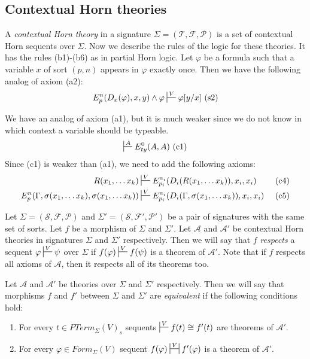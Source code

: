 \documentclass{amsart}
\theoremstyle{definition}
\theoremstyle{remark}
\numberwithin{figure}{section}
\begin{document}
\subsection{Contextual Horn theories}

A \emph{contextual Horn theory} in a signature $\Sigma = (\mathcal{T}, \mathcal{F}, \mathcal{P})$ is a set of contextual Horn sequents over $\Sigma$.
Now we describe the rules of the logic for these theories.
It has the rules (b1)-(b6) as in partial Horn logic.
Let $\varphi$ be a formula such that a variable $x$ of sort $(p,n)$ appears in $\varphi$ exactly once.
Then we have the following analog of axiom (a2):
\[ E^n_p(D_x(\varphi), x, y) \land \varphi \sststile{}{V} \varphi[y/x] \text{ (s2)} \]

We have an analog of axiom (a1), but it is much weaker since we do not know in which context a variable should be typeable.
\[ \sststile{}{A} E^0_{ty}(A,A) \text{ (c1)} \]
Since (c1) is weaker than (a1), we need to add the following axioms:
\begin{align*}
R(x_1, \ldots x_k) & \sststile{}{V} E^{n_i}_{p_i}(D_i(R(x_1, \ldots x_k)), x_i, x_i) & \text{ (c4)} \\
E^n_p(\Gamma, \sigma(x_1, \ldots x_k), \sigma(x_1, \ldots x_k)) & \sststile{}{V} E^{n_i}_{p_i}(D_i(\Gamma, \sigma(x_1, \ldots x_k)), x_i, x_i) & \text{ (c5)}
\end{align*}

Let $\Sigma = (\mathcal{S}, \mathcal{F}, \mathcal{P})$ and $\Sigma' = (\mathcal{S}, \mathcal{F}', \mathcal{P}')$ be a pair of signatures with the same set of sorts.
Let $f$ be a morphism of $\Sigma$ and $\Sigma'$.
Let $\mathcal{A}$ and $\mathcal{A}'$ be contextual Horn theories in signatures $\Sigma$ and $\Sigma'$ respectively.
Then we will say that $f$ \emph{respects} a sequent $\varphi \sststile{}{V} \psi$ over $\Sigma$ if $f(\varphi) \sststile{}{V} f(\psi)$ is a theorem of $\mathcal{A}'$.
Note that if $f$ respects all axioms of $\mathcal{A}$, then it respects all of its theorems too.

Let $\mathcal{A}$ and $\mathcal{A}'$ be theories over $\Sigma$ and $\Sigma'$ respectively.
Then we will say that morphisms $f$ and $f'$ between $\Sigma$ and $\Sigma'$ are \emph{equivalent} if the following conditions hold:
\begin{enumerate}
\item For every $t \in PTerm_\Sigma(V)_s$ sequents $\sststile{}{V} f(t) \cong f'(t)$ are theorems of $\mathcal{A}'$.
\label{mor-eq-a}
\item For every $\varphi \in Form_\Sigma(V)$ sequent $f(\varphi) \ssststile{}{V} f'(\varphi)$ is a theorem of $\mathcal{A}'$.
\label{mor-eq-b}
\end{enumerate}
\end{document}
